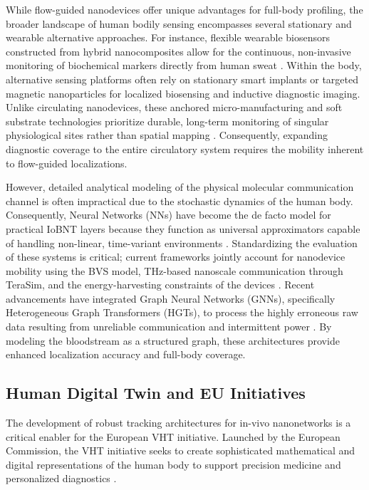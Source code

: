 \documentclass[sigconf]{acmart}
\begin{document}
While flow-guided nanodevices offer unique advantages for full-body profiling, the broader landscape of human bodily sensing encompasses several stationary and wearable alternative approaches. For instance, flexible wearable biosensors constructed from hybrid nanocomposites allow for the continuous, non-invasive monitoring of biochemical markers directly from human sweat \cite{sharma2021wearable}. Within the body, alternative sensing platforms often rely on stationary smart implants or targeted magnetic nanoparticles for localized biosensing and inductive diagnostic imaging. Unlike circulating nanodevices, these anchored micro-manufacturing and soft substrate technologies prioritize durable, long-term monitoring of singular physiological sites rather than spatial mapping \cite{kenry2016emerging}. Consequently, expanding diagnostic coverage to the entire circulatory system requires the mobility inherent to flow-guided localizations. 

However, detailed analytical modeling of the physical molecular communication channel is often impractical due to the stochastic dynamics of the human body. Consequently, Neural Networks (NNs) have become the de facto model for practical IoBNT layers because they function as universal approximators capable of handling non-linear, time-variant environments \cite{torres2025communicating}. Standardizing the evaluation of these systems is critical; current frameworks jointly account for nanodevice mobility using the BVS model, THz-based nanoscale communication through TeraSim, and the energy-harvesting constraints of the devices \cite{lopez2023toward}. Recent advancements have integrated Graph Neural Networks (GNNs), specifically Heterogeneous Graph Transformers (HGTs), to process the highly erroneous raw data resulting from unreliable communication and intermittent power \cite{bartra2024graph}. By modeling the bloodstream as a structured graph, these architectures provide enhanced localization accuracy and full-body coverage.

\subsection{Human Digital Twin and EU Initiatives}
The development of robust tracking architectures for in-vivo nanonetworks is a critical enabler for the European VHT initiative. Launched by the European Commission, the VHT initiative seeks to create sophisticated mathematical and digital representations of the human body to support precision medicine and personalized diagnostics \cite{ec2023vht}. 
\end{document}
